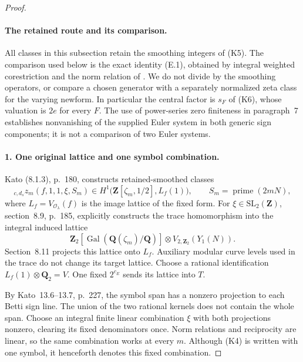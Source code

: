 \begin{proof}\leavevmode
\paragraph{The retained route and its comparison.}
All classes in this subsection retain the smoothing integers of (K5).
The comparison used below is the exact identity (E.1), obtained by
integral weighted corestriction and the norm relation of
\cite[Proposition 8.12]{kato}. We do not divide by the smoothing
operators, or compare a chosen generator with a separately normalized
zeta class for the varying newform. In particular the central factor
is $s_F$ of (K6), whose valuation is $2e$ for every $F$.
The use of power-series zero finiteness in paragraph~7 establishes
nonvanishing of the supplied Euler system in both generic sign
components; it is not a comparison of two Euler systems.

\paragraph{1. One original lattice and one symbol combination.}
Kato (8.1.3), p.~180, constructs retained-smoothed classes
\[
 {}_{c,d_s}z_m(f,1,1,\xi,S_m)
 \in H^1\bigl(\mathbf Z[\zeta_m,1/2],L_f(1)\bigr),
 \qquad S_m=\operatorname{prime}(2mN),                      \tag{K4}
\]
where $L_f=V_{\mathcal O_\lambda}(f)$ is the image lattice of the
fixed form. For $\xi\in\mathrm{SL}_2(\mathbf Z)$, section~8.9,
p.~185, explicitly constructs the trace homomorphism into the
integral induced lattice
\[
 \mathbf Z_2[\operatorname{Gal}(\mathbf Q(\zeta_m)/\mathbf Q)]
       \otimes V_{2,\mathbf Z_2}(Y_1(N)).
\]
Section~8.11 projects this lattice onto $L_f$. Auxiliary modular
curve levels used in the trace do not change its target lattice.
Choose a rational identification $L_f(1)\otimes\mathbf Q_2=V$.
One fixed $2^{c_E}$ sends its lattice into $T$.

By Kato~13.6--13.7, p.~227, the symbol span has a nonzero projection
to each Betti sign line. The union of the two rational kernels does
not contain the whole span. Choose an integral finite linear
combination $\xi$ with both projections nonzero, clearing its fixed
denominators once. Norm relations and reciprocity are linear, so
the same combination works at every $m$. Although (K4) is written
with one symbol, it henceforth denotes this fixed combination.


\end{proof}
